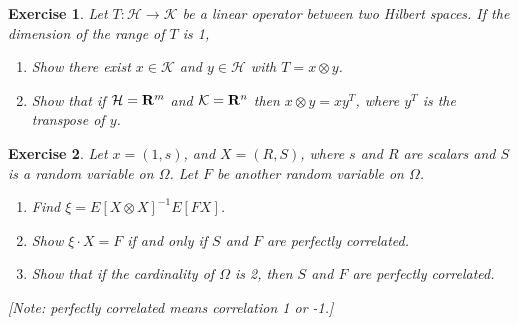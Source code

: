\documentclass[11pt,fleqn]{amsproc}
\newcommand{\R}{{\bf R}}
\renewcommand{\H}{\mathcal{H}}
\newcommand{\K}{\mathcal{K}}
\newtheorem{xca}{Exercise}
\begin{document}
\begin{xca}
Let $T\colon\H\to\K$ be a linear operator between two Hilbert spaces. If the dimension
of the range of $T$ is 1,
\begin{enumerate}
\item Show there exist $x\in\K$ and $y\in\H$ with $T = x\otimes y$.
\item Show that if $\H = \R^m$ and $\K = \R^n$ then $x\otimes y = xy^T$, where
$y^T$ is the transpose of $y$.
\end{enumerate}
\end{xca}

\begin{xca}
Let $x = (1, s)$, and $X = (R, S)$, where $s$ and $R$ are scalars and 
$S$ is a random variable on $\Omega$.
Let $F$ be another random variable on $\Omega$.
\begin{enumerate}
\item Find $\xi = E[X\otimes X]^{-1} E[FX]$.
\item Show $\xi\cdot X = F$ if and only if $S$ and $F$ are perfectly correlated.
\item Show that if the cardinality of $\Omega$ is 2, then $S$ and $F$ are perfectly correlated.
\end{enumerate}
[Note: perfectly correlated means correlation 1 or -1.]
\end{xca}
\end{document}

